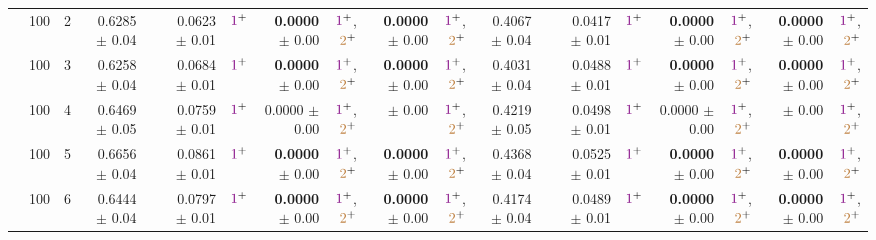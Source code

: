 \begin{table}
\begin{tiny}
\begin{tabular}[t]{rrrrrrrrrrrrrrrrrrr}
 & 100 & 2 & 0.6285 $\pm$ 0.04 &  & 0.0623 $\pm$ 0.01 & $\textcolor{violet}{1}^{+}$ & \textbf{0.0000} $\pm$ 0.00 & $\textcolor{violet}{1}^{+}$,$\textcolor{brown}{2}^{+}$ & \textbf{0.0000} $\pm$ 0.00 & $\textcolor{violet}{1}^{+}$,$\textcolor{brown}{2}^{+}$ & 0.4067 $\pm$ 0.04 &  & 0.0417 $\pm$ 0.01 & $\textcolor{violet}{1}^{+}$ & \textbf{0.0000} $\pm$ 0.00 & $\textcolor{violet}{1}^{+}$,$\textcolor{brown}{2}^{+}$ & \textbf{0.0000} $\pm$ 0.00 & $\textcolor{violet}{1}^{+}$,$\textcolor{brown}{2}^{+}$\\

 & 100 & 3 & 0.6258 $\pm$ 0.04 &  & 0.0684 $\pm$ 0.01 & $\textcolor{violet}{1}^{+}$ & \textbf{0.0000} $\pm$ 0.00 & $\textcolor{violet}{1}^{+}$,$\textcolor{brown}{2}^{+}$ & \textbf{0.0000} $\pm$ 0.00 & $\textcolor{violet}{1}^{+}$,$\textcolor{brown}{2}^{+}$ & 0.4031 $\pm$ 0.04 &  & 0.0488 $\pm$ 0.01 & $\textcolor{violet}{1}^{+}$ & \textbf{0.0000} $\pm$ 0.00 & $\textcolor{violet}{1}^{+}$,$\textcolor{brown}{2}^{+}$ & \textbf{0.0000} $\pm$ 0.00 & $\textcolor{violet}{1}^{+}$,$\textcolor{brown}{2}^{+}$\\

 & 100 & 4 & 0.6469 $\pm$ 0.05 &  & 0.0759 $\pm$ 0.01 & $\textcolor{violet}{1}^{+}$ & 0.0000 $\pm$ 0.00 & $\textcolor{violet}{1}^{+}$,$\textcolor{brown}{2}^{+}$ & \cellcolor{gray!0}{\textbf{0.0000}} $\pm$ 0.00 & $\textcolor{violet}{1}^{+}$,$\textcolor{brown}{2}^{+}$ & 0.4219 $\pm$ 0.05 &  & 0.0498 $\pm$ 0.01 & $\textcolor{violet}{1}^{+}$ & 0.0000 $\pm$ 0.00 & $\textcolor{violet}{1}^{+}$,$\textcolor{brown}{2}^{+}$ & \cellcolor{gray!0}{\textbf{0.0000}} $\pm$ 0.00 & $\textcolor{violet}{1}^{+}$,$\textcolor{brown}{2}^{+}$\\

 & 100 & 5 & 0.6656 $\pm$ 0.04 &  & 0.0861 $\pm$ 0.01 & $\textcolor{violet}{1}^{+}$ & \textbf{0.0000} $\pm$ 0.00 & $\textcolor{violet}{1}^{+}$,$\textcolor{brown}{2}^{+}$ & \textbf{0.0000} $\pm$ 0.00 & $\textcolor{violet}{1}^{+}$,$\textcolor{brown}{2}^{+}$ & 0.4368 $\pm$ 0.04 &  & 0.0525 $\pm$ 0.01 & $\textcolor{violet}{1}^{+}$ & \textbf{0.0000} $\pm$ 0.00 & $\textcolor{violet}{1}^{+}$,$\textcolor{brown}{2}^{+}$ & \textbf{0.0000} $\pm$ 0.00 & $\textcolor{violet}{1}^{+}$,$\textcolor{brown}{2}^{+}$\\

 & 100 & 6 & 0.6444 $\pm$ 0.04 &  & 0.0797 $\pm$ 0.01 & $\textcolor{violet}{1}^{+}$ & \textbf{0.0000} $\pm$ 0.00 & $\textcolor{violet}{1}^{+}$,$\textcolor{brown}{2}^{+}$ & \textbf{0.0000} $\pm$ 0.00 & $\textcolor{violet}{1}^{+}$,$\textcolor{brown}{2}^{+}$ & 0.4174 $\pm$ 0.04 &  & 0.0489 $\pm$ 0.01 & $\textcolor{violet}{1}^{+}$ & \textbf{0.0000} $\pm$ 0.00 & $\textcolor{violet}{1}^{+}$,$\textcolor{brown}{2}^{+}$ & \textbf{0.0000} $\pm$ 0.00 & $\textcolor{violet}{1}^{+}$,$\textcolor{brown}{2}^{+}$\\


\end{tabular}
\end{tiny}
\end{table}
